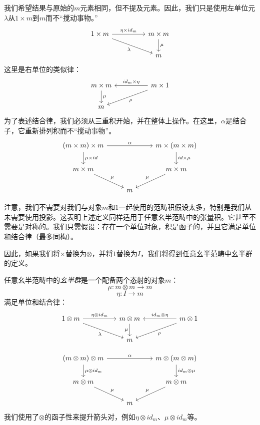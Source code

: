 \documentclass[DaoFP]{subfiles}
\begin{document}
 我们希望结果与原始的$m$元素相同，但不提及元素。因此，我们只是使用左单位元$\lambda$从$1 \times m$到$m$而不“搅动事物。”
 \[
  \begin{tikzcd}
   1 \times m
   \arrow[rr, "\eta \times id_m"]
   \arrow[rrd, "\lambda"']
   & & m \times m
   \arrow[d, "\mu"]
   \\
   && m
  \end{tikzcd}
 \]
 这里是右单位的类似律：
 \[
  \begin{tikzcd}
   m \times m
   \arrow[d, "\mu"]
   && m \times 1
   \arrow[ll, "id_m \times \eta"']
   \arrow[lld, "\rho"]
   \\
   m
  \end{tikzcd}
 \]
 为了表述结合律，我们必须从三重积开始，并在整体上操作。在这里，$\alpha$是结合子，它重新排列积而不“搅动事物”。
 \[
  \begin{tikzcd}
  (m \times m) \times m
  \arrow[rr, "\alpha"]
  \arrow[d, "\mu \times id"]
  &&
  m \times (m \times m)
  \arrow[d, "id \times \mu"]
  \\
  m \times m
  \arrow[dr, "\mu"]
  & & m \times m
  \arrow[dl, "\mu"']
  \\
  &  m
  \end{tikzcd}
 \]

 注意，我们不需要对我们与对象$m$和$1$一起使用的范畴积假设太多，特别是我们从未需要使用投影。这表明上述定义同样适用于任意幺半范畴中的张量积。它甚至不需要是对称的。我们只需假设：存在一个单位对象，积是函子的，并且它满足单位和结合律（最多同构）。

 因此，如果我们将$\times$替换为$\otimes$，并将$1$替换为$I$，我们将得到任意幺半范畴中幺半群的定义。

 任意幺半范畴中的\emph{幺半群}是一个配备两个态射的对象$m$：
 \[ \mu \colon m \otimes m \to m \]
 \[ \eta \colon I \to m \]
 满足单位和结合律：
 \[
  \begin{tikzcd}
   1 \otimes m
   \arrow[rr, "\eta \otimes id_m"]
   \arrow[rrd, "\lambda"']
   & & m \otimes m
   \arrow[d, "\mu"']
   && m \otimes 1
   \arrow[ll, "id_m \otimes \eta"']
   \arrow[lld, "\rho"]
   \\
   && m
  \end{tikzcd}
 \]

 \[
  \begin{tikzcd}
  (m \otimes m) \otimes m
  \arrow[rr, "\alpha"]
  \arrow[d, "\mu \otimes id_m"]
  &&
  m \otimes (m \otimes m)
  \arrow[d, "id_m \otimes \mu"]
  \\
  m \otimes m
  \arrow[dr, "\mu"]
  & & m \otimes m
  \arrow[dl, "\mu"']
  \\
  &  m
  \end{tikzcd}
 \]
 我们使用了$\otimes$的函子性来提升箭头对，例如$\eta \otimes id_m$、$\mu \otimes id_m$等。
\end{document}
